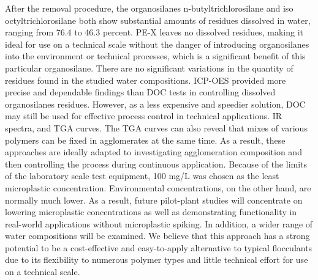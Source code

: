 \documentclass[12pt]{article}
\begin{document}
After the removal procedure, the organosilanes n-butyltrichlorosilane and iso octyltrichlorosilane both show substantial amounts of residues dissolved in water, ranging from 76.4 to 46.3 percent. PE-X leaves no dissolved residues, making it ideal for use on a technical scale without the danger of introducing organosilanes into the environment or technical processes, which is a significant benefit of this particular organosilane. There are no significant variations in the quantity of residues found in the studied water compositions. ICP-OES provided more precise and dependable findings than DOC tests in controlling dissolved organosilanes residues. However, as a less expensive and speedier solution, DOC may still be used for effective process control in technical applications.
IR spectra, and TGA curves. The TGA curves can also reveal that mixes of various polymers can be fixed in agglomerates at the same time. As a result, these approaches are ideally adapted to investigating agglomeration composition and then controlling the process during continuous application. Because of the limits of the laboratory scale test equipment, 100 mg/L was chosen as the least microplastic concentration. Environmental concentrations, on the other hand, are normally much lower. As a result, future pilot-plant studies will concentrate on lowering microplastic concentrations as well as demonstrating functionality in real-world applications without microplastic spiking.
In addition, a wider range of water compositions will be examined. We believe that this approach has a strong potential to be a cost-effective and easy-to-apply alternative to typical flocculants due to its flexibility to numerous polymer types and little technical effort for use on a technical scale.
\end{document}
